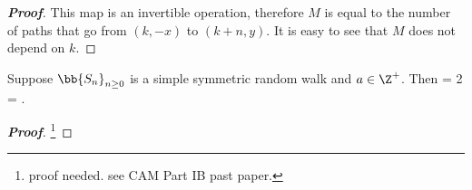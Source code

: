 \begin{proof}[\bf Proof]
%
%
%
%
%
%
%
%
%
%
%
%


This map is an invertible operation, therefore $M$ is equal to the number of paths that go from $(k,-x)$ to $(k+n,y)$. It is easy to see that $M$ does not depend on $k$.
\end{proof}

\begin{corollary}
Suppose $\bb{S_n}_{n\geq 0}$ is a simple symmetric random walk and $a\in \Z^+$. Then
\be
\pro{} = 2\pro{} = \pro{}.
\ee
\end{corollary}

\begin{proof}[\bf Proof]
\footnote{proof needed. see CAM Part IB past paper.}
\end{proof}



